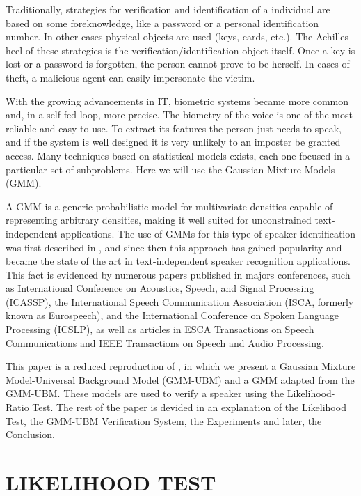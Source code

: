 \documentclass[a4paper,twocolumn]{article}
\begin{document}
Traditionally, strategies for verification and identification of a individual are based on some foreknowledge, like a password or a personal identification number. In other cases physical objects are used (keys, cards, etc.). The Achilles heel of these strategies is the verification/identification object itself. Once a key is lost or a password is forgotten, the person cannot prove to be herself. In cases of theft, a malicious agent can easily impersonate the victim.

With the growing advancements in IT, biometric systems became more common and, in a self fed loop, more precise. The biometry of the voice is one of the most reliable and easy to use. To extract its features the person just needs to speak, and if the system is well designed it is very unlikely to an imposter be granted access. Many techniques based on statistical models exists, each one focused in a particular set of subproblems. Here we will use the Gaussian Mixture Models (GMM).

A GMM is a generic probabilistic model for multivariate densities capable of representing arbitrary densities, making it well suited for unconstrained text-independent applications. The use of GMMs for this type of speaker identification was first described in \cite{rose_reynolds_1990}, and since then this approach has gained popularity and became the state of the art in text-independent speaker recognition applications. This fact is evidenced by numerous papers published in majors conferences, such as International Conference on Acoustics, Speech, and Signal Processing (ICASSP), the International Speech Communication Association (ISCA, formerly known as Eurospeech), and the International Conference on Spoken Language Processing (ICSLP), as well as articles in ESCA Transactions on Speech Communications and IEEE Transactions on Speech and Audio Processing.

This paper is a reduced reproduction of \cite{reynolds_et_al_2000}, in which we present a Gaussian Mixture Model-Universal Background Model (GMM-UBM) and a GMM adapted from the GMM-UBM. These models are used to verify a speaker using the Likelihood-Ratio Test. The rest of the paper is devided in an explanation of the Likelihood Test, the GMM-UBM Verification System, the Experiments and later, the Conclusion.


\section{LIKELIHOOD TEST}
\label{likelihood_test}
\end{document}
